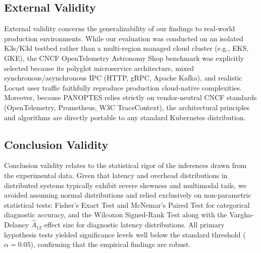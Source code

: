 \subsection{External Validity}
External validity concerns the generalizability of our findings to real-world production environments. While our evaluation was conducted on an isolated K3s/K3d testbed rather than a multi-region managed cloud cluster (e.g., EKS, GKE), the CNCF OpenTelemetry Astronomy Shop benchmark was explicitly selected because its polyglot microservice architecture, mixed synchronous/asynchronous IPC (HTTP, gRPC, Apache Kafka), and realistic Locust user traffic faithfully reproduce production cloud-native complexities. Moreover, because PANOPTES relies strictly on vendor-neutral CNCF standards (OpenTelemetry, Prometheus, W3C TraceContext), the architectural principles and algorithms are directly portable to any standard Kubernetes distribution.

\subsection{Conclusion Validity}
Conclusion validity relates to the statistical rigor of the inferences drawn from the experimental data. Given that latency and overhead distributions in distributed systems typically exhibit severe skewness and multimodal tails, we avoided assuming normal distributions and relied exclusively on non-parametric statistical tests: Fisher's Exact Test and McNemar's Paired Test for categorical diagnostic accuracy, and the Wilcoxon Signed-Rank Test along with the Vargha-Delaney $\hat{A}_{12}$ effect size for diagnostic latency distributions. All primary hypothesis tests yielded significance levels well below the standard threshold ($\alpha = 0.05$), confirming that the empirical findings are robust.
